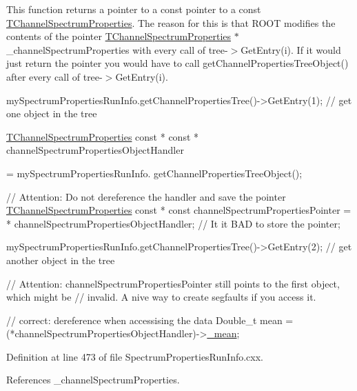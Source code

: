 This function returns a pointer to a const pointer to a const \hyperlink{class_t_channel_spectrum_properties}{T\-Channel\-Spectrum\-Properties}. The reason for this is that R\-O\-O\-T modifies the contents of the pointer {\ttfamily \hyperlink{class_t_channel_spectrum_properties}{T\-Channel\-Spectrum\-Properties}} {\ttfamily $\ast$} {\ttfamily \-\_\-channel\-Spectrum\-Properties} with every call of {\ttfamily tree-\/$>$Get\-Entry(i)}. If it would just return the pointer you would have to call get\-Channel\-Properties\-Tree\-Object() after every call of {\ttfamily tree-\/$>$Get\-Entry(i)}. 
\begin{DoxyCode}
mySpectrumPropertiesRunInfo.getChannelPropertiesTree()->GetEntry(1); \textcolor{comment}{// get one object in the tree}

\hyperlink{class_t_channel_spectrum_properties}{TChannelSpectrumProperties} \textcolor{keyword}{const} * \textcolor{keyword}{const} * channelSpectrumPropertiesObjectHandler
       
                                                 = mySpectrumPropertiesRunInfo.
      getChannelPropertiesTreeObject();

\textcolor{comment}{// Attention: Do not dereference the handler and save the pointer}
\hyperlink{class_t_channel_spectrum_properties}{TChannelSpectrumProperties} \textcolor{keyword}{const} * \textcolor{keyword}{const} channelSpectrumPropertiesPointer = * 
      channelSpectrumPropertiesObjectHandler; \textcolor{comment}{// It it BAD to store the pointer;}

mySpectrumPropertiesRunInfo.getChannelPropertiesTree()->GetEntry(2); \textcolor{comment}{// get another object in the tree}

\textcolor{comment}{// Attention: channelSpectrumPropertiesPointer still points to the first object, which might be}
\textcolor{comment}{// invalid. A nive way to create segfaults if you access it.}

\textcolor{comment}{// correct: dereference when accessising the data}
Double\_t mean = (*channelSpectrumPropertiesObjectHandler)->\hyperlink{class_t_channel_spectrum_properties_a480a137b650eda8d36fb633de95259d1}{\_mean};
\end{DoxyCode}
 

Definition at line 473 of file Spectrum\-Properties\-Run\-Info.\-cxx.



References \-\_\-channel\-Spectrum\-Properties.

